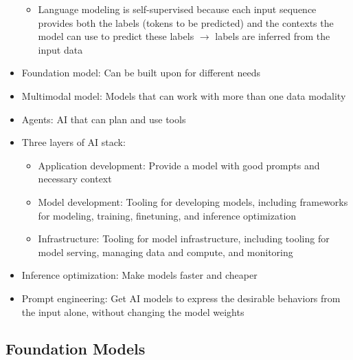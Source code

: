 \documentclass[11pt]{scrartcl}
\begin{document}
\begin{itemize}
\begin{itemize}
		\item Language modeling is self-supervised because each input sequence provides both the labels (tokens to be predicted) and the contexts the model can use to predict these labels $\to$ labels are inferred from the input data
	\end{itemize}
	\item Foundation model: Can be built upon for different needs
	\item Multimodal model: Models that can work with more than one data modality
	\item Agents: AI that can plan and use tools
	\item Three layers of AI stack:
	\begin{itemize}
		\item Application development: Provide a model with good prompts and necessary context
		\item Model development: Tooling for developing models, including frameworks for modeling, training, finetuning, and inference optimization
		\item Infrastructure: Tooling for model infrastructure, including tooling for model serving, managing data and compute, and monitoring
	\end{itemize}
	\item Inference optimization: Make models faster and cheaper
	\item Prompt engineering: Get AI models to express the desirable behaviors from the input alone, without changing the model weights
\end{itemize}

\subsection*{Foundation Models}
\end{document}
